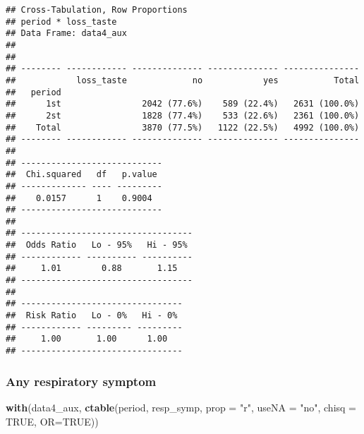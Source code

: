 \documentclass[
]{article}
\newenvironment{Shaded}{\begin{snugshade}}{\end{snugshade}}
\newcommand{\DataTypeTok}[1]{\textcolor[rgb]{0.13,0.29,0.53}{#1}}
\newcommand{\KeywordTok}[1]{\textcolor[rgb]{0.13,0.29,0.53}{\textbf{#1}}}
\newcommand{\NormalTok}[1]{#1}
\newcommand{\OtherTok}[1]{\textcolor[rgb]{0.56,0.35,0.01}{#1}}
\newcommand{\StringTok}[1]{\textcolor[rgb]{0.31,0.60,0.02}{#1}}
\begin{document}
\begin{verbatim}
## Cross-Tabulation, Row Proportions  
## period * loss_taste  
## Data Frame: data4_aux  
## 
## 
## -------- ------------ -------------- -------------- ---------------
##            loss_taste             no            yes           Total
##   period                                                           
##      1st                2042 (77.6%)    589 (22.4%)   2631 (100.0%)
##      2st                1828 (77.4%)    533 (22.6%)   2361 (100.0%)
##    Total                3870 (77.5%)   1122 (22.5%)   4992 (100.0%)
## -------- ------------ -------------- -------------- ---------------
## 
## ----------------------------
##  Chi.squared   df   p.value 
## ------------- ---- ---------
##    0.0157      1    0.9004  
## ----------------------------
## 
## ----------------------------------
##  Odds Ratio   Lo - 95%   Hi - 95% 
## ------------ ---------- ----------
##     1.01        0.88       1.15   
## ----------------------------------
## 
## --------------------------------
##  Risk Ratio   Lo - 0%   Hi - 0% 
## ------------ --------- ---------
##     1.00       1.00      1.00   
## --------------------------------
\end{verbatim}

\hypertarget{any-respiratory-symptom-2}{%
\subsubsection{Any respiratory
symptom}\label{any-respiratory-symptom-2}}

\begin{Shaded}
\begin{Highlighting}[]
\KeywordTok{with}\NormalTok{(data4_aux, }\KeywordTok{ctable}\NormalTok{(period, resp_symp, }\DataTypeTok{prop =} \StringTok{"r"}\NormalTok{, }\DataTypeTok{useNA =} \StringTok{"no"}\NormalTok{, }\DataTypeTok{chisq =} \OtherTok{TRUE}\NormalTok{, }\DataTypeTok{OR=}\OtherTok{TRUE}\NormalTok{))}
\end{Highlighting}
\end{Shaded}
\end{document}
